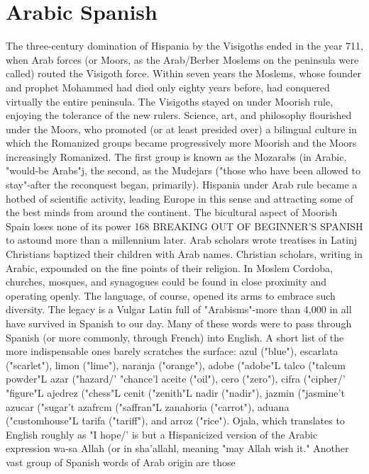 \section{Arabic Spanish}

The three-century domination of Hispania by the Visigoths
ended in the year 711, when Arab forces (or Moors, as the Arab/Berber
Moslems on the peninsula were called) routed the Visigoth force.
Within seven years the Moslems, whose founder and prophet Mohammed had died only eighty years before, had conquered virtually the entire peninsula. The Visigoths stayed on under Moorish rule, enjoying
the tolerance of the new rulers. Science, art, and philosophy flourished
under the Moors, who promoted (or at least presided over) a bilingual
culture in which the Romanized groups became progressively more
Moorish and the Moors increasingly Romanized. The first group is
known as the Mozarabs (in Arabic, "would-be Arabs"j, the second, as
the Mudejars ("those who have been allowed to stay"-after the reconquest began, primarily). Hispania under Arab rule became a hotbed of
scientific activity, leading Europe in this sense and attracting some of
the best minds from around the continent.
The bicultural aspect of Moorish Spain loses none of its power
168 BREAKING OUT OF BEGINNER'S SPANISH
to astound more than a millennium later. Arab scholars wrote treatises
in Latinj Christians baptized their children with Arab names. Christian scholars, writing in Arabic, expounded on the fine points of their
religion. In Moslem Cordoba, churches, mosques, and synagogues
could be found in close proximity and operating openly.
The language, of course, opened its arms to embrace such
diversity. The legacy is a Vulgar Latin full of "Arabisms"-more
than 4,000 in all have survived in Spanish to our day. Many of these
words were to pass through Spanish (or more commonly, through
French) into English. A short list of the more indispensable ones
barely scratches the surface: azul ("blue"), escarlata ("scarlet"), limon ("lime"), naranja ("orange"), adobe ("adobe"L talco ("talcum
powder"L azar ("hazard/' "chance'l aceite ("oil"), cero ("zero"), cifra
("cipher/' "figure"L ajedrez ("chess"L cenit ("zenith"L nadir ("nadir"),
jazmin ("jasmine't azucar ("sugar't azafrcm ("saffran"L zanahoria
("carrot"), aduana ("customhouse"L tarifa ("tariff"), and arroz ("rice").
Ojala, which translates to English roughly as "I hope/' is but
a Hispanicized version of the Arabic expression wa-sa Allah (or in
sha'allahl, meaning "may Allah wish it."
Another vast group of Spanish words of Arab origin are those
